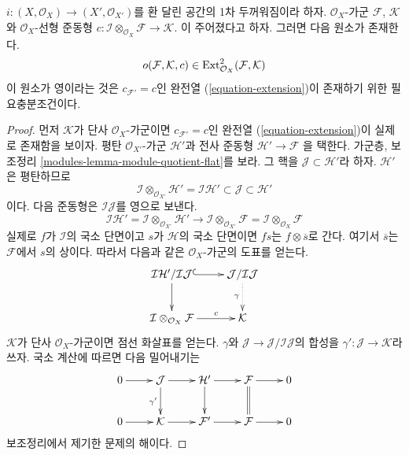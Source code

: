 \begin{lemma}
\label{lemma-inf-obs-ext}
$i:(X,\mathcal{O}_X)\to(X',\mathcal{O}_{X'})$를 환 달린 공간의
1차 두꺼워짐이라 하자. $\mathcal{O}_X$-가군 $\mathcal{F}$,
$\mathcal{K}$와 $\mathcal{O}_X$-선형 준동형
$c : \mathcal{I} \otimes_{\mathcal{O}_X} \mathcal{F} \to \mathcal{K}$.
이 주어졌다고 하자. 그러면 다음 원소가 존재한다.
$$
o(\mathcal{F}, \mathcal{K}, c) \in
\mathop{\mathrm{Ext}}\nolimits^2_{\mathcal{O}_X}(\mathcal{F}, \mathcal{K})
$$
이 원소가 영이라는 것은 $c_{\mathcal{F}'}=c$인 완전열
(\ref{equation-extension})이 존재하기 위한 필요충분조건이다.
\end{lemma}

\begin{proof}
먼저 $\mathcal{K}$가 단사 $\mathcal{O}_X$-가군이면
$c_{\mathcal{F}'}=c$인 완전열 (\ref{equation-extension})이 실제로
존재함을 보이자. 평탄 $\mathcal{O}_{X'}$-가군 $\mathcal{H}'$과
전사 준동형
$\mathcal{H}' \to \mathcal{F}$
을 택한다. 가군층, 보조정리 \ref{modules-lemma-module-quotient-flat}를
보라. 그 핵을 $\mathcal{J}\subset\mathcal{H}'$라 하자.
$\mathcal{H}'$은 평탄하므로
$$
\mathcal{I} \otimes_{\mathcal{O}_{X'}} \mathcal{H}' =
\mathcal{I}\mathcal{H}'
\subset \mathcal{J} \subset \mathcal{H}'
$$
이다. 다음 준동형은 $\mathcal{I}\mathcal{J}$를 영으로 보낸다.
$$
\mathcal{I}\mathcal{H}' =
\mathcal{I} \otimes_{\mathcal{O}_{X'}} \mathcal{H}'
\longrightarrow
\mathcal{I} \otimes_{\mathcal{O}_{X'}} \mathcal{F} =
\mathcal{I} \otimes_{\mathcal{O}_X} \mathcal{F}
$$
실제로 $f$가 $\mathcal{I}$의 국소 단면이고 $s$가 $\mathcal{H}$의
국소 단면이면 $fs$는 $f\otimes\overline{s}$로 간다. 여기서
$\overline{s}$는 $\mathcal{F}$에서 $s$의 상이다. 따라서 다음과 같은
$\mathcal{O}_X$-가군의 도표를 얻는다.
$$
\xymatrix{
\mathcal{I}\mathcal{H}'/\mathcal{I}\mathcal{J}
\ar@{^{(}->}[r] \ar[d] &
\mathcal{J}/\mathcal{I}\mathcal{J} \ar@{..>}[d]_\gamma \\
\mathcal{I} \otimes_{\mathcal{O}_X} \mathcal{F} \ar[r]^-c &
\mathcal{K}
}
$$
$\mathcal{K}$가 단사 $\mathcal{O}_X$-가군이면 점선 화살표를 얻는다.
$\gamma$와 $\mathcal{J}\to\mathcal{J}/\mathcal{I}\mathcal{J}$의 합성을
$\gamma':\mathcal{J}\to\mathcal{K}$라 쓰자. 국소 계산에 따르면 다음
밀어내기는
$$
\xymatrix{
0 \ar[r] &
\mathcal{J} \ar[r] \ar[d]_{\gamma'} &
\mathcal{H}' \ar[r] \ar[d] &
\mathcal{F} \ar[r] \ar@{=}[d] &
0 \\
0 \ar[r] &
\mathcal{K} \ar[r] &
\mathcal{F}' \ar[r] &
\mathcal{F} \ar[r] &
0
}
$$
보조정리에서 제기한 문제의 해이다.


\end{proof}

